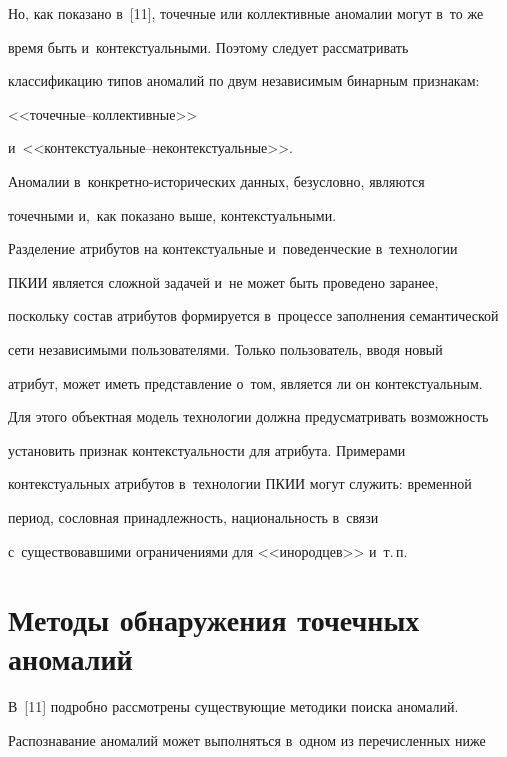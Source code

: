   


  Но, как показано в~[11], точечные или коллективные аномалии могут в~то же 


время быть и~контекстуальными. Поэтому следует рассматривать 


классификацию типов аномалий по двум независимым бинарным признакам: 


<<то\-чеч\-ные--кол\-лек\-тив\-ные>>  


и~<<кон\-текс\-ту\-аль\-ные--не\-кон\-текс\-ту\-аль\-ные>>.


  


  Аномалии в~конкретно-исторических данных, безусловно, являются 


точечными и,~как показано выше, контекстуальными.


  


  Разделение атрибутов на контекстуальные и~поведенческие в~технологии 


ПКИИ является сложной задачей и~не может быть проведено заранее, 


поскольку состав атрибутов формируется в~процессе заполнения семантической 


сети независимыми пользователями. Только пользователь, вводя новый 


атрибут, может иметь представление о~том, является ли он контекстуальным. 


Для этого объектная модель технологии должна предусматривать возможность 


установить признак контекстуальности для атрибута. Примерами 


контекстуальных атрибутов в~технологии ПКИИ могут служить: временной 


период, сословная принадлежность, национальность в~связи 


с~существовавшими ограничениями для <<инородцев>> и~т.\,п.


  


\section{Методы обнаружения точечных аномалий}





  В~[11] подробно рассмотрены существующие методики поиска аномалий. 


Распознавание аномалий может выполняться в~одном из перечисленных ниже 


